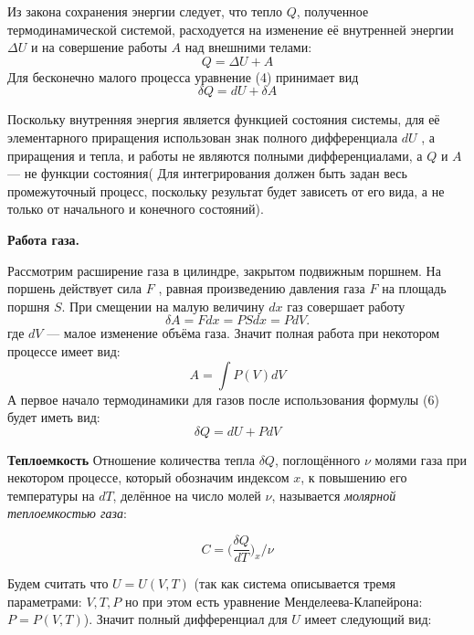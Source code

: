 \documentclass[10pt]{article}
\begin{document}
    Из закона сохранения энергии следует, что тепло $Q$, полученное термодинамической системой, расходуется на изменение её внутренней энергии $\Delta U$ и на совершение работы $A$ над внешними телами:
    \begin{equation}
        Q = \Delta U + A
    \end{equation}
    Для бесконечно малого процесса уравнение (4) принимает вид 
    \begin{equation}
        \delta Q = dU + \delta A
    \end{equation}

    Поскольку внутренняя энергия является функцией состояния системы, для её элементарного приращения использован знак полного дифференциала $dU$ , а приращения и тепла, и работы не являются полными дифференциалами, а $Q$ и $A$ — не функции состояния(
    Для интегрирования должен быть задан весь промежуточный процесс, поскольку результат будет зависеть от его вида, а не только от начального и конечного состояний).

    \textbf{ Работа газа.}

    Рассмотрим расширение газа в цилиндре, закрытом подвижным поршнем. На поршень действует сила $F$ , равная произведению давления газа $F$ на площадь поршня $S$. При смещении на малую величину $dx$ газ совершает работу
    \begin{equation}
        \delta A = F dx = P S dx = P dV.
    \end{equation}
    где $dV$  — малое изменение объёма газа.
    Значит полная работа при некотором процессе имеет вид:
    \begin{equation}
        A = \int P(V) dV
    \end{equation}
    А первое начало термодинамики для газов после использования формулы (6) будет иметь вид:
    \begin{equation}
        \delta Q = dU + P dV
    \end{equation}

    \textbf{Теплоемкость}
    Отношение количества тепла $\delta Q$, поглощённого $\nu$ молями газа при некотором процессе, который обозначим индексом $x$, к повышению его температуры на $dT$, делённое на число молей $\nu$, называется \textit{молярной теплоемкостью газа}:

    \begin{equation}
        C = \bigg(\frac{\delta Q}{dT}\bigg)_x / \nu
    \end{equation}

    Будем считать что $U = U(V,T)$ (так как система описывается тремя параметрами: $V,T,P$ но при этом есть уравнение Менделеева-Клапейрона: $P = P(V,T)$).
    Значит полный дифференциал для $U$ имеет следующий вид:
\end{document}

